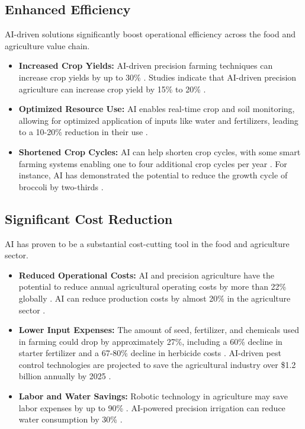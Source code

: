 \subsection{Enhanced Efficiency}
AI-driven solutions significantly boost operational efficiency across the food and agriculture value chain.
\begin{itemize}
    \item \textbf{Increased Crop Yields:} AI-driven precision farming techniques can increase crop yields by up to 30\% \cite{SustainabilityLinkedIn_Benefits}. Studies indicate that AI-driven precision agriculture can increase crop yield by 15\% to 20\% \cite{RenewableEnergyMagazine_Benefits}.
    \item \textbf{Optimized Resource Use:} AI enables real-time crop and soil monitoring, allowing for optimized application of inputs like water and fertilizers, leading to a 10-20\% reduction in their use \cite{SustainabilityLinkedIn_Benefits}.
    \item \textbf{Shortened Crop Cycles:} AI can help shorten crop cycles, with some smart farming systems enabling one to four additional crop cycles per year \cite{TechNative_Benefits}. For instance, AI has demonstrated the potential to reduce the growth cycle of broccoli by two-thirds \cite{IGrowNews_Benefits}.
\end{itemize}

\subsection{Significant Cost Reduction}
AI has proven to be a substantial cost-cutting tool in the food and agriculture sector.
\begin{itemize}
    \item \textbf{Reduced Operational Costs:} AI and precision agriculture have the potential to reduce annual agricultural operating costs by more than 22\% globally \cite{ARKInvest_Benefits}. AI can reduce production costs by almost 20\% in the agriculture sector \cite{MoonTechnolabs_Benefits}.
    \item \textbf{Lower Input Expenses:} The amount of seed, fertilizer, and chemicals used in farming could drop by approximately 27\%, including a 60\% decline in starter fertilizer and a 67-80\% decline in herbicide costs \cite{ARKInvest_Benefits}. AI-driven pest control technologies are projected to save the agricultural industry over \$1.2 billion annually by 2025 \cite{ArtSmart_Benefits}.
    \item \textbf{Labor and Water Savings:} Robotic technology in agriculture may save labor expenses by up to 90\% \cite{Datategy_Benefits}. AI-powered precision irrigation can reduce water consumption by 30\% \cite{SmartDev_Benefits}.
\end{itemize}


